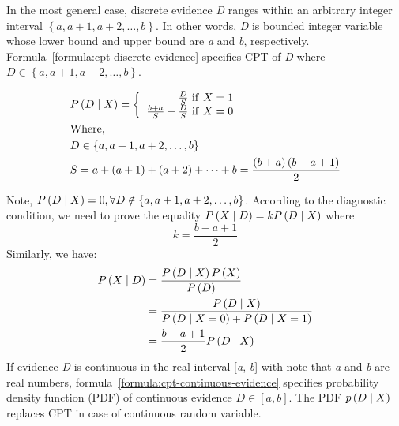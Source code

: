 \documentclass{article}
\numberwithin{equation}{section}
\numberwithin{figure}{section}
\numberwithin{table}{section}
\begin{document}
In the most general case, discrete evidence \textit{D} ranges within an arbitrary integer interval $\left\{a,a+1,a+2,\dots ,b\right\}$. In other words, \textit{D} is bounded integer variable whose lower bound and upper bound are \textit{a} and \textit{b}, respectively. Formula~\ref{formula:cpt-discrete-evidence} specifies CPT of \textit{D} where $D\in \left\{a,a+1,a+2,\dots ,b\right\}$.

\begin{equation}
\begin{split}
&P\left(D\mathrel{\left|\vphantom{D X}\right.\kern-\nulldelimiterspace}X\right)=\left\{ \begin{array}{r}
\frac{D}{S}\ \mathrm{if}\ X=1 \\ 
\frac{b+a}{S}-\frac{D}{S}\ \mathrm{if}\ X=0 \end{array}
\right.\\
&\mathrm{Where,}\\
&D\in \left\{a,a+1,a+2,\dots ,b\right\}\\
&S=a+\left(a+1\right)+\left(a+2\right)+\dots +b=\frac{\left(b+a\right)\left(b-a+1\right)}{2}
\end{split}
\label{formula:cpt-discrete-evidence}
\end{equation} 

Note, $P\left(D\mathrel{\left|\vphantom{D X}\right.\kern-\nulldelimiterspace}X\right)=0,\forall D\notin \left\{a,a+1,a+2,\dots ,b\right\}$. According to the diagnostic condition, we need to prove the equality $P\left(X\mathrel{\left|\vphantom{X D}\right.\kern-\nulldelimiterspace}D\right)=kP\left(D\mathrel{\left|\vphantom{D X}\right.\kern-\nulldelimiterspace}X\right)$ where
\[k=\frac{b-a+1}{2}\] 
Similarly, we have:
\begin{align*}
P\left(X\mathrel{\left|\vphantom{X D}\right.\kern-\nulldelimiterspace}D\right)&=\frac{P\left(D\mathrel{\left|\vphantom{D X}\right.\kern-\nulldelimiterspace}X\right)P\left(X\right)}{P\left(D\right)}\\
&=\frac{P\left(D\mathrel{\left|\vphantom{D X}\right.\kern-\nulldelimiterspace}X\right)}{P\left(D\mathrel{\left|\vphantom{D X=0}\right.\kern-\nulldelimiterspace}X=0\right)+P\left(D\mathrel{\left|\vphantom{D X=1}\right.\kern-\nulldelimiterspace}X=1\right)}\\
&=\frac{b-a+1}{2}P\left(D\mathrel{\left|\vphantom{D X}\right.\kern-\nulldelimiterspace}X\right)
\end{align*}
If evidence \textit{D} is continuous in the real interval [\textit{a}, \textit{b}] with note that \textit{a} and \textit{b} are real numbers, formula~\ref{formula:cpt-continuous-evidence} specifies probability density function (PDF) of continuous evidence $D\in \left[a,b\right]$. The PDF $p\left(D\mathrel{\left|\vphantom{D X}\right.\kern-\nulldelimiterspace}X\right)$ replaces CPT in case of continuous random variable.
\end{document}
